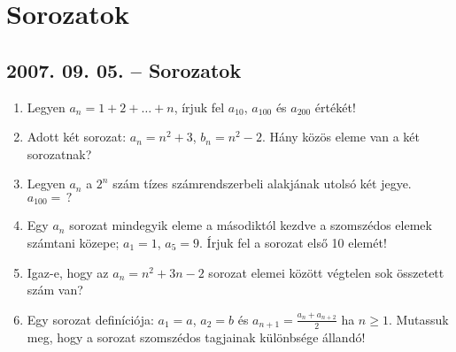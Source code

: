 \documentclass{article}
\begin{document}
\section*{Sorozatok}

\subsection*{2007. 09. 05. -- Sorozatok}
\begin{enumerate}
\item Legyen  $a_n=1+2+\ldots+n$, írjuk fel $a_{10}$, $a_{100}$ és $a_{200}$ értékét!
\item Adott két sorozat: $a_n=n^2+3$, $b_n=n^2-2$.  Hány közös eleme van a két sorozatnak?
\item Legyen $a_n$ a $2^n$ szám tízes számrendszerbeli alakjának utolsó két jegye. $a_{100}=\,?$
\item Egy $a_n$ sorozat mindegyik eleme a másodiktól kezdve a szomszédos elemek számtani közepe;
$a_1=1$, $a_5=9$. Írjuk fel a sorozat első 10 elemét!
\item Igaz-e, hogy az $a_n=n^2+3n-2$ sorozat elemei között végtelen sok összetett szám van?
\item Egy sorozat definíciója: $a_1=a$, $a_2=b$ és $\displaystyle{a_{n+1}=\frac{a_n+a_{n+2}}{2}}$ ha $n\ge 1$.
Mutassuk meg, hogy a sorozat szomszédos tagjainak különbsége állandó!
\end{enumerate}
\end{document}
